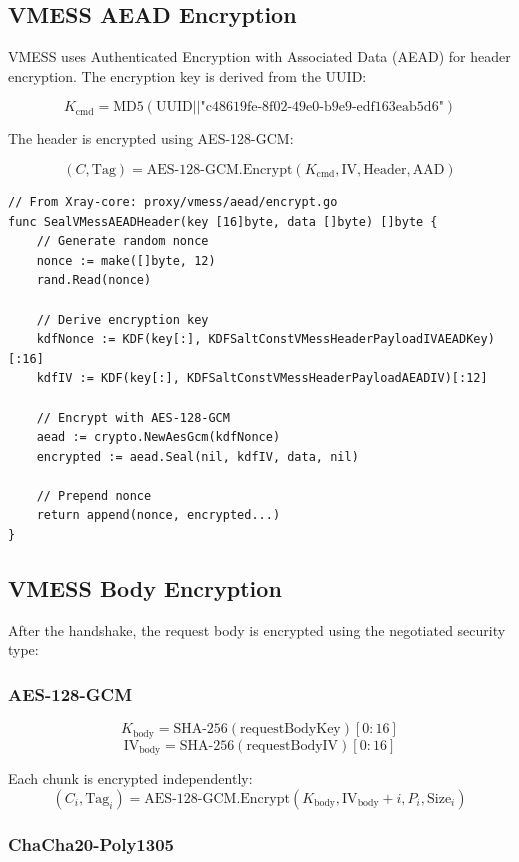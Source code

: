 \subsection{VMESS AEAD Encryption}

VMESS uses Authenticated Encryption with Associated Data (AEAD) for header encryption. The encryption key is derived from the UUID:

\[
K_{\text{cmd}} = \text{MD5}(\text{UUID} || \text{"c48619fe-8f02-49e0-b9e9-edf163eab5d6"})
\]

The header is encrypted using AES-128-GCM:

\[
(C, \text{Tag}) = \text{AES-128-GCM.Encrypt}(K_{\text{cmd}}, \text{IV}, \text{Header}, \text{AAD})
\]

\begin{verbatim}
// From Xray-core: proxy/vmess/aead/encrypt.go
func SealVMessAEADHeader(key [16]byte, data []byte) []byte {
    // Generate random nonce
    nonce := make([]byte, 12)
    rand.Read(nonce)
    
    // Derive encryption key
    kdfNonce := KDF(key[:], KDFSaltConstVMessHeaderPayloadIVAEADKey)[:16]
    kdfIV := KDF(key[:], KDFSaltConstVMessHeaderPayloadAEADIV)[:12]
    
    // Encrypt with AES-128-GCM
    aead := crypto.NewAesGcm(kdfNonce)
    encrypted := aead.Seal(nil, kdfIV, data, nil)
    
    // Prepend nonce
    return append(nonce, encrypted...)
}
\end{verbatim}

\subsection{VMESS Body Encryption}

After the handshake, the request body is encrypted using the negotiated security type:

\subsubsection{AES-128-GCM}

\[
K_{\text{body}} = \text{SHA-256}(\text{requestBodyKey})[0:16]
\]
\[
\text{IV}_{\text{body}} = \text{SHA-256}(\text{requestBodyIV})[0:16]
\]

Each chunk is encrypted independently:
\[
(C_i, \text{Tag}_i) = \text{AES-128-GCM.Encrypt}(K_{\text{body}}, \text{IV}_{\text{body}} + i, P_i, \text{Size}_i)
\]

\subsubsection{ChaCha20-Poly1305}

